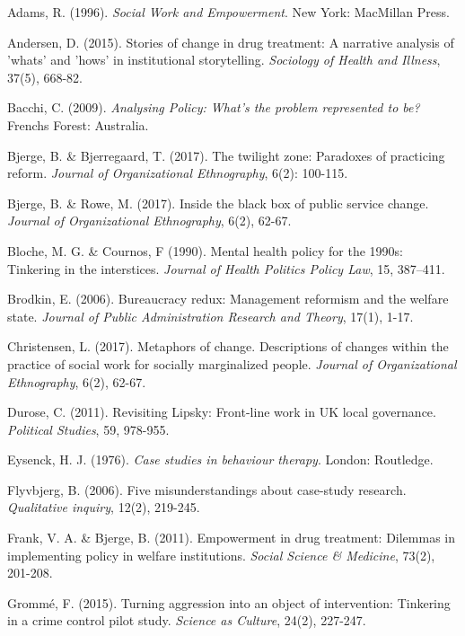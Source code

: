 \label{paper2:references}
\begin{thebibliography}{99}

\item Adams, R. (1996). \textit{Social Work and Empowerment}. New York: MacMillan Press.  
\item Andersen, D. (2015). Stories of change in drug treatment: A narrative analysis of 'whats' and 'hows' in institutional storytelling. \textit{Sociology of Health and Illness}, 37(5), 668-82.
\item Bacchi, C. (2009). \textit{Analysing Policy: What’s the problem represented to be?} Frenchs Forest: Australia. 
\item Bjerge, B. \& Bjerregaard, T. (2017). The twilight zone: Paradoxes of practicing reform. \textit{Journal of Organizational Ethnography}, 6(2): 100-115. 
\item Bjerge, B. \& Rowe, M. (2017). Inside the black box of public service change. \textit{Journal of Organizational Ethnography}, 6(2), 62-67.
\item Bloche, M. G. \& Cournos, F (1990). Mental health policy for the 1990s: Tinkering in the interstices. \textit{Journal of Health Politics Policy Law}, 15, 387–411.
\item Brodkin, E. (2006). Bureaucracy redux: Management reformism and the welfare state. \textit{Journal of Public Administration Research and Theory}, 17(1), 1-17.
\item Christensen, L. (2017). Metaphors of change. Descriptions of changes within the practice of social work for socially marginalized people. \textit{Journal of Organizational Ethnography}, 6(2), 62-67.
\item Durose, C. (2011). Revisiting Lipsky: Front-line work in UK local governance. \textit{Political Studies}, 59, 978-955.
\item Eysenck, H. J. (1976). \textit{Case studies in behaviour therapy}. London: Routledge. 
\item Flyvbjerg, B. (2006). Five misunderstandings about case-study research. \textit{Qualitative inquiry}, 12(2), 219-245.
\item Frank, V. A. \& Bjerge, B. (2011). Empowerment in drug treatment: Dilemmas in implementing policy in welfare institutions. \textit{Social Science \& Medicine}, 73(2), 201-208.
\item Grommé, F. (2015). Turning aggression into an object of intervention: Tinkering in a crime control pilot study. \textit{Science as Culture}, 24(2), 227-247.

\end{thebibliography}
